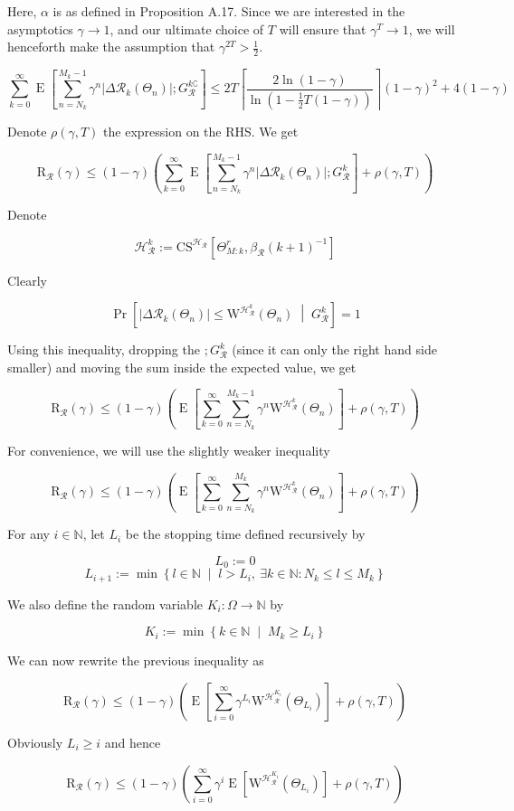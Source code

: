 \documentclass[a4paper]{article}
\newcommand{\AP}[1]{\left(#1\right)}
\newcommand{\AB}[1]{\left[#1\right]}
\newcommand{\ABM}[2]{\left[#1\;\middle\vert\;#2\right]}
\newcommand{\ACM}[2]{\left\{#1\;\middle\vert\;#2\right\}}
\newcommand{\Abs}[1]{\left\vert #1 \right\vert}
\newcommand{\Ceil}[1]{\left\lceil #1 \right\rceil}
\newcommand{\CPb}[2]{\operatorname{Pr}\ABM{#1}{#2}}
\newcommand{\E}[1]{\operatorname{E}\AB{#1}}
\newcommand{\Nats}{\mathbb{N}}
\newcommand{\R}{\mathcal{R}}
\newcommand{\Hy}{\mathcal{H}}
\newcommand{\Reg}{\mathrm{R}}
\newcommand{\ET}{N}
\newcommand{\IT}{M}
\newcommand{\CSE}{G}
\newcommand{\CS}{\mathrm{CS}}
\newcommand{\W}{\mathrm{W}}
\begin{document}
Here, $\alpha$ is as defined in Proposition A.17. Since we are interested in the asymptotics $\gamma\rightarrow1$, and our ultimate choice of $T$ will ensure that $\gamma^T\rightarrow1$, we will henceforth make the assumption that $\gamma^{2T}>\frac{1}{2}$.

$$\sum_{k=0}^\infty\E{\sum_{n=\ET_k}^{\IT_k-1}\gamma^{n}\Abs{\Delta\R_k\AP{\Theta_n}};\CSE_\R^{k\complement}}\leq2T\Ceil{\frac{2\ln(1-\gamma)}{\ln\AP{1-\frac{1}{2}T(1-\gamma)}}}(1-\gamma)^2+4(1-\gamma)$$

Denote $\rho(\gamma,T)$ the expression on the RHS. We get

$$\Reg_\R(\gamma)\leq(1-\gamma)\AP{\sum_{k=0}^\infty\E{\sum_{n=\ET_k}^{\IT_k-1}\gamma^{n}\Abs{\Delta\R_k\AP{\Theta_n}};\CSE_\R^k}+\rho(\gamma,T)}$$

Denote

$$\Hy_\R^k:=\CS^{\Hy_\R}\AB{\Theta_{M:k}^r,\beta_\R(k+1)^{-1}}$$

Clearly

$$\CPb{\Abs{\Delta\R_k\AP{\Theta_n}}\leq\W^{\Hy_\R^k}\AP{\Theta_n}}{\CSE_\R^k}=1$$

Using this inequality, dropping the $;G_\R^k$ (since it can only the right hand side smaller) and moving the sum inside the expected value, we get

$$\Reg_\R(\gamma)\leq(1-\gamma)\AP{\E{\sum_{k=0}^\infty\sum_{n=\ET_k}^{\IT_k-1}\gamma^{n}\W^{\Hy_\R^k}\AP{\Theta_n}}+\rho(\gamma,T)}$$

For convenience, we will use the slightly weaker inequality

$$\Reg_\R(\gamma)\leq(1-\gamma)\AP{\E{\sum_{k=0}^\infty\sum_{n=\ET_k}^{\IT_k}\gamma^{n}\W^{\Hy_\R^k}\AP{\Theta_n}}+\rho(\gamma,T)}$$

For any $i\in\Nats$, let $L_i$ be the stopping time defined recursively by

$$L_0:=0$$
$$L_{i+1}:=\min\ACM{l\in\Nats}{l>L_i,\ \exists k\in\Nats:\ET_k\leq l \leq \IT_k}$$

We also define the random variable $K_i:\Omega\rightarrow\Nats$ by

$$K_i:=\min\ACM{k\in\Nats}{\IT_k\geq L_i}$$

We can now rewrite the previous inequality as

$$\Reg_\R(\gamma)\leq(1-\gamma)\AP{\E{\sum_{i=0}^\infty\gamma^{L_i}\W^{\Hy_\R^{K_i}}\AP{\Theta_{L_i}}}+\rho(\gamma,T)}$$

Obviously $L_i\geq i$ and hence

$$\Reg_\R(\gamma)\leq(1-\gamma)\AP{\sum_{i=0}^\infty\gamma^{i}\E{\W^{\Hy_\R^{K_i}}\AP{\Theta_{L_i}}}+\rho(\gamma,T)}$$
\end{document}

